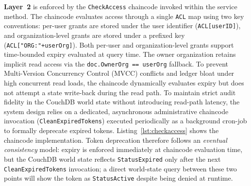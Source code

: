 \documentclass{ieeeaccess}
\begin{document}
\textbf{Layer~2} is enforced by the \texttt{CheckAccess} chaincode
invoked within the service method. The chaincode evaluates access
through a single \texttt{ACL} map using two key conventions: per-user
grants are stored under the user identifier (\texttt{ACL[userID]}), and
organization-level grants are stored under a prefixed key
(\texttt{ACL["ORG:"+userOrg]}). Both per-user and organization-level
grants support time-bounded expiry evaluated at query time. The owner
organization retains implicit read access via the \texttt{doc.OwnerOrg ==
userOrg} fallback. To prevent Multi-Version Concurrency Control (MVCC) conflicts and ledger bloat under high concurrent read loads, the chaincode dynamically evaluates expiry but does not attempt a state write-back during the read path. To maintain strict audit fidelity in the CouchDB world state without introducing read-path latency, the system design relies on a dedicated, asynchronous administrative chaincode invocation (\texttt{CleanExpiredTokens}) executed periodically as a background cron-job to formally deprecate expired tokens.  Listing~\ref{lst:checkaccess} shows the chaincode implementation. Token deprecation therefore follows an \emph{eventual consistency} model: expiry is enforced immediately at chaincode evaluation time, but the CouchDB world state reflects \texttt{StatusExpired} only after the next \texttt{CleanExpiredTokens} invocation; a direct world-state query between these two points will show the token as \texttt{StatusActive} despite being denied at runtime.
\end{document}
